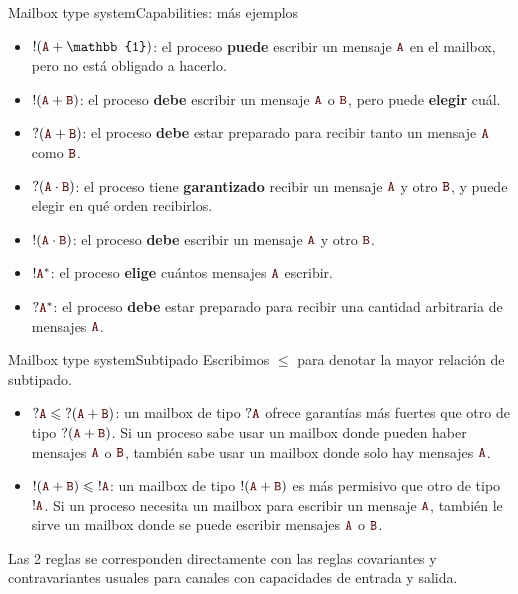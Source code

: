 \documentclass{beamer}
\newcommand{\msgtag}[1]{\texttt{\textcolor{msg-color}{#1}}}
\begin{document}
\begin{frame}{Mailbox type system}{Capabilities: más ejemplos}
    \vspace{1em}
    \begin{itemize}
        \item $!(\msgtag{A} + \mathbb{1})$: el proceso \textbf{puede} escribir un mensaje $\msgtag{A}$ en el mailbox, pero no está obligado a hacerlo.
        \item $!(\msgtag{A} + \msgtag{B})$: el proceso \textbf{debe} escribir un mensaje $\msgtag{A}$ o $\msgtag{B}$, pero puede \textbf{elegir} cuál.
        \item $?(\msgtag{A} + \msgtag{B})$: el proceso \textbf{debe} estar preparado para recibir tanto un mensaje $\msgtag{A}$ como $\msgtag{B}$.
        \item $?(\msgtag{A} \cdot \msgtag{B})$: el proceso tiene \textbf{garantizado} recibir un mensaje $\msgtag{A}$ y otro $\msgtag{B}$, y puede elegir en qué orden recibirlos.
        \item $!(\msgtag{A} \cdot \msgtag{B})$: el proceso \textbf{debe} escribir un mensaje $\msgtag{A}$ y otro $\msgtag{B}$.
        \item $!\msgtag{A}^\ast$: el proceso \textbf{elige} cuántos mensajes $\msgtag{A}$ escribir.
        \item $?\msgtag{A}^\ast$: el proceso \textbf{debe} estar preparado para recibir una cantidad arbitraria de mensajes $\msgtag{A}$.
    \end{itemize}
\end{frame}



\begin{frame}{Mailbox type system}{Subtipado}
    Escribimos $\leqslant$ para denotar la mayor relación de subtipado.
    \vspace{1em}

    \begin{itemize}
        \item $?\msgtag{A} \leqslant \hspace{0.3em} ?(\msgtag{A} + \msgtag{B})$: un mailbox de tipo $?\msgtag{A}$ ofrece garantías más fuertes que otro de tipo $?(\msgtag{A} + \msgtag{B})$. Si un proceso sabe usar un mailbox donde pueden haber mensajes $\msgtag{A}$ o $\msgtag{B}$, también sabe usar un mailbox donde solo hay mensajes $\msgtag{A}$.
        \item $!(\msgtag{A} + \msgtag{B}) \leqslant \hspace{0.3em} !\msgtag{A}$: un mailbox de tipo $!(\msgtag{A} + \msgtag{B})$ es más permisivo que otro de tipo $!\msgtag{A}$. Si un proceso necesita un mailbox para escribir un mensaje $\msgtag{A}$, también le sirve un mailbox donde se puede escribir mensajes $\msgtag{A}$ o $\msgtag{B}$.
    \end{itemize}
    \vspace{1em}

    Las 2 reglas se corresponden directamente con las reglas covariantes y contravariantes usuales para canales con capacidades de entrada y salida.
\end{frame}
\end{document}

